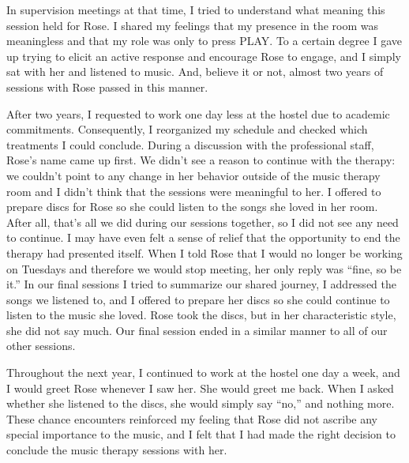 \documentclass[authordate, empirical]{jote-new-article}
\begin{document}
In supervision meetings at that time, I tried to understand what meaning this session held for Rose. I shared my feelings that my presence in the room was meaningless and that my role was only to press PLAY. To a certain degree I gave up trying to elicit an active response and encourage Rose to engage, and I simply sat with her and listened to music. And, believe it or not, almost two years of sessions with Rose passed in this manner.



After two years, I requested to work one day less at the hostel due to academic commitments. Consequently, I reorganized my schedule and checked which treatments I could conclude. During a discussion with the professional staff, Rose's name came up first. We didn't see a reason to continue with the therapy: we couldn't point to any change in her behavior outside of the music therapy room and I didn't think that the sessions were meaningful to her. I offered to prepare discs for Rose so she could listen to the songs she loved in her room. After all, that's all we did during our sessions together, so I did not see any need to continue. I may have even felt a sense of relief that the opportunity to end the therapy had presented itself. When I told Rose that I would no longer be working on Tuesdays and therefore we would stop meeting, her only reply was “fine, so be it.” In our final sessions I tried to summarize our shared journey, I addressed the songs we listened to, and I offered to prepare her discs so she could continue to listen to the music she loved. Rose took the discs, but in her characteristic style, she did not say much. Our final session ended in a similar manner to all of our other sessions.



Throughout the next year, I continued to work at the hostel one day a week, and I would greet Rose whenever I saw her. She would greet me back. When I asked whether she listened to the discs, she would simply say “no,” and nothing more. These chance encounters reinforced my feeling that Rose did not ascribe any special importance to the music, and I felt that I had made the right decision to conclude the music therapy sessions with her.
\end{document}

